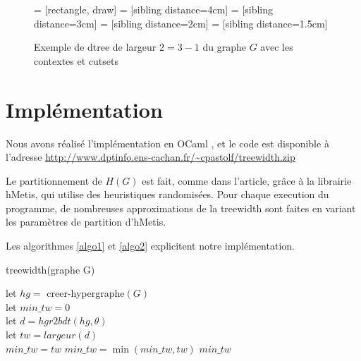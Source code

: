\documentclass{article}
\begin{document}
\begin{figure}[H]
   = [rectangle, draw]
   = [sibling distance=4cm]
   = [sibling distance=3cm]
   = [sibling distance=2cm]
   = [sibling distance=1.5cm]
  \centering
 \caption{Exemple de dtree de largeur $2=3-1$ du graphe $G$ avec les contextes et cutsets}
\label{lol3}
\end{figure}

\newpage

\section{Implémentation}
Nous avons réalisé l'implémentation en OCaml \cite{ocaml}, et le code
est disponible à l'adresse
\url{http://www.dptinfo.ens-cachan.fr/~cpastolf/treewidth.zip}

Le partitionnement de $H(G)$ est fait, comme dans l'article, grâce à
la librairie hMetis, qui utilise des heuristiques randomisées.
Pour chaque execution du programme, de nombreuses approximations de la
treewidth sont faites en variant les paramètres de partition d'hMetis.

Les algorithmes \ref{algo1} et \ref{algo2} explicitent notre implémentation.


\begin{algorithm}
  \caption{treewidth(graphe G)}
  \begin{algorithmic}
    \STATE let $hg =$ \mbox{creer-hypergraphe}$(G)$\\
    \STATE let $min\_tw=0$\\
    \FOR {$\theta \in \Theta$}
        \STATE let $d = hgr2bdt(hg, \theta)$\\
        \STATE let $tw = largeur(d)$\\
          \STATE $min\_tw=tw$
        \ELSE
          \STATE $min\_tw=\min(min\_tw, tw)$
        \ENDIF
      \ENDFOR
    \ENDFOR
    \RETURN $min\_tw$ 
  \end{algorithmic}
  \label{algo1}
\end{algorithm}
\end{document}
